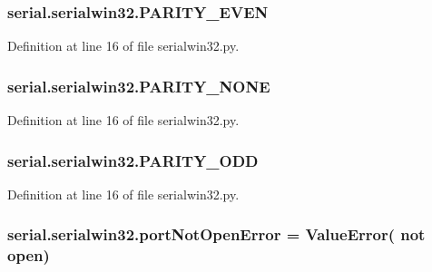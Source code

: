 \subsubsection[{\texorpdfstring{P\+A\+R\+I\+T\+Y\+\_\+\+E\+V\+EN}{PARITY_EVEN}}]{\setlength{\rightskip}{0pt plus 5cm}serial.\+serialwin32.\+P\+A\+R\+I\+T\+Y\+\_\+\+E\+V\+EN}\hypertarget{namespaceserial_1_1serialwin32_a3987b42c1108f6a8d11b720f63101a98}{}\label{namespaceserial_1_1serialwin32_a3987b42c1108f6a8d11b720f63101a98}


Definition at line 16 of file serialwin32.\+py.

\subsubsection[{\texorpdfstring{P\+A\+R\+I\+T\+Y\+\_\+\+N\+O\+NE}{PARITY_NONE}}]{\setlength{\rightskip}{0pt plus 5cm}serial.\+serialwin32.\+P\+A\+R\+I\+T\+Y\+\_\+\+N\+O\+NE}\hypertarget{namespaceserial_1_1serialwin32_a3262413e04005207c48aa488bc61f345}{}\label{namespaceserial_1_1serialwin32_a3262413e04005207c48aa488bc61f345}


Definition at line 16 of file serialwin32.\+py.

\subsubsection[{\texorpdfstring{P\+A\+R\+I\+T\+Y\+\_\+\+O\+DD}{PARITY_ODD}}]{\setlength{\rightskip}{0pt plus 5cm}serial.\+serialwin32.\+P\+A\+R\+I\+T\+Y\+\_\+\+O\+DD}\hypertarget{namespaceserial_1_1serialwin32_a4f6c2910ae24c9a599633c82e86efa14}{}\label{namespaceserial_1_1serialwin32_a4f6c2910ae24c9a599633c82e86efa14}


Definition at line 16 of file serialwin32.\+py.

\subsubsection[{\texorpdfstring{port\+Not\+Open\+Error}{portNotOpenError}}]{\setlength{\rightskip}{0pt plus 5cm}serial.\+serialwin32.\+port\+Not\+Open\+Error = Value\+Error( not open\textquotesingle{})}\hypertarget{namespaceserial_1_1serialwin32_a18d3eeae695f6e06385f45f180164187}{}\label{namespaceserial_1_1serialwin32_a18d3eeae695f6e06385f45f180164187}


